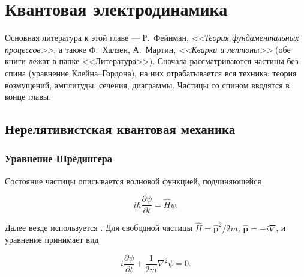 \documentclass[../final.tex]{subfiles}
\begin{document}
\ifSubfilesClassLoaded{\setcounter{chapter}{1}\setcounter{section}{0}}{}



\chapter{Квантовая электродинамика}


Основная литература к этой главе ---
Р.~Фейнман, \emph{<<Теория фундаментальных процессов>>},
а также Ф.~Халзен, А.~Мартин, \emph{<<Кварки и лептоны>>}
(обе книги лежат в папке <<Литература>>).
Сначала рассматриваются частицы без спина (уравнение Клейна--Гордона),
на них отрабатывается вся техника: теория возмущений, амплитуды,
сечения, диаграммы. Частицы со спином вводятся в конце главы.


\section{Нерелятивистская квантовая механика}

\subsection{Уравнение Шрёдингера}

Состояние частицы описывается волновой функцией, подчиняющейся

\begin{equation*}
    i\hbar\frac{\partial\psi}{\partial t}
    =
    \hat H\psi.
\end{equation*}

Далее везде используется .
Для свободной частицы $\hat H=\hat{\mathbf p}^2/2m$,
$\hat{\mathbf p}=-i\nabla$, и уравнение принимает вид

\begin{equation*}
    i\frac{\partial\psi}{\partial t}
    +
    \frac{1}{2m}\nabla^2\psi
    =
    0.
\end{equation*}
\end{document}
